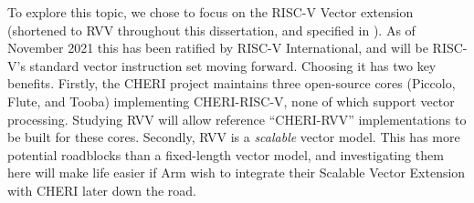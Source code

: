 To explore this topic, we chose to focus on the RISC-V Vector extension (shortened to RVV throughout this dissertation, and specified in \cite{RISCVVectorExtension2021}).
As of November 2021 this has been ratified by RISC-V International, and will be RISC-V's standard vector instruction set moving forward.
Choosing it has two key benefits.
Firstly, the CHERI project maintains three open-source cores (Piccolo, Flute, and Tooba) implementing CHERI-RISC-V, none of which support vector processing.
Studying RVV will allow reference \enquote{CHERI-RVV} implementations to be built for these cores.
Secondly, RVV is a \emph{scalable} vector model.
This has more potential roadblocks than a fixed-length vector model, and investigating them here will make life easier if Arm wish to integrate their Scalable Vector Extension with CHERI later down the road.




